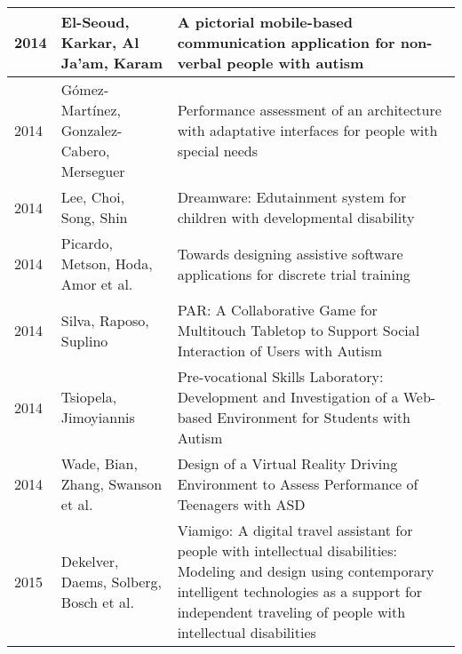 \documentclass[utf8,english]{gradu3}
\begin{document}
\begin{longtable}{|>{\scriptsize}l|>{\scriptsize}p{3cm}|>{\scriptsize}p{10.4cm}|}
  2014          & El-Seoud, Karkar, Al Ja'am, Karam                            & A pictorial mobile-based communication application for non-verbal people with autism                                                                                                                                           \\ \hline
  2014          & Gómez-Martínez, Gonzalez-Cabero, Merseguer                   & Performance assessment of an architecture with adaptative interfaces for people with special needs                                                                                                                             \\ \hline
  2014          & Lee, Choi, Song, Shin                                        & Dreamware: Edutainment system for children with developmental disability                                                                                                                                                       \\ \hline
  2014          & Picardo, Metson, Hoda, Amor et al.                           & Towards designing assistive software applications for discrete trial training                                                                                                                                                  \\ \hline
  2014          & Silva, Raposo, Suplino                                       & PAR: A Collaborative Game for Multitouch Tabletop to Support Social Interaction of Users with Autism                                                                                                                           \\ \hline
  2014          & Tsiopela, Jimoyiannis                                        & Pre-vocational Skills Laboratory: Development and Investigation of a Web-based Environment for Students with Autism                                                                                                            \\ \hline
  2014          & Wade, Bian, Zhang, Swanson et al.                            & Design of a Virtual Reality Driving Environment to Assess Performance of Teenagers with ASD                                                                                                                                    \\ \hline
  2015          & Dekelver, Daems, Solberg, Bosch et al.                       & Viamigo: A digital travel assistant for people with intellectual disabilities: Modeling and design using contemporary intelligent technologies as a support for independent traveling of people with intellectual disabilities \\ \hline

\end{longtable}
\end{document}
